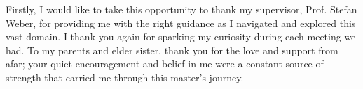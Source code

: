 \documentclass[a4paper, 12pt, oneside]{report}         %
\begin{document}

\begin{thesisacknowledgments}                     %
  Firstly, I would like to take this opportunity to thank my supervisor, Prof. Stefan Weber, for providing me with the right guidance as I navigated and explored this vast domain. I thank you again for sparking my curiosity during each meeting we had. To my parents and elder sister, thank you for the love and support from afar; your quiet encouragement and belief in me were a constant source of strength that carried me through this master’s journey.         %
\end{thesisacknowledgments}                       %
  
  
\tableofcontents                                  %
\listoftables                                     %
\listoffigures                                    %

\setlength{\headheight}{14.49998pt}








\nocite{*}                                        %



\begin{appendix}

% 
\end{appendix}
\end{document}
